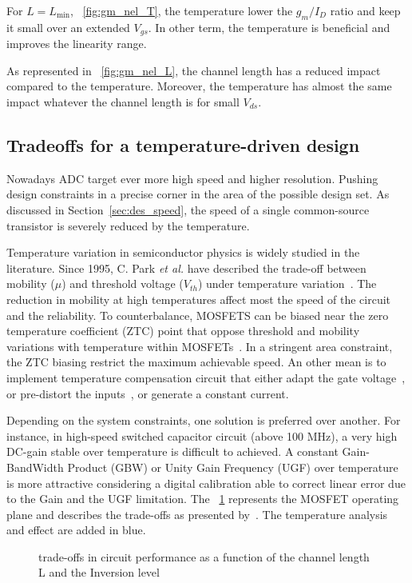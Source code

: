 For \(L = L_{\min}\), \figurename~\ref{fig:gm_nel_T}, the temperature lower the \(g_m/I_D\) ratio and keep it small over an extended \(V_{gs}\). In other term, the temperature is beneficial and improves the linearity range.

As represented in \figurename~\ref{fig:gm_nel_L}, the channel length has a reduced impact compared to the temperature. Moreover, the temperature has almost the same impact whatever the channel length is for small \(V_{ds}\).

\subsection{Tradeoffs for a temperature-driven design}
Nowadays ADC target ever more high speed and higher resolution. Pushing design constraints in a precise corner in the area of the possible design set. As discussed in Section~\ref{sec:des_speed}, the speed of a single common-source transistor is severely reduced by the temperature. 

Temperature variation in semiconductor physics is widely studied in the literature. Since 1995, C. Park \textit{et al.} have described the trade-off between mobility (\(\mu \)) and threshold voltage (\(V_{th} \)) under temperature variation~\cite{Park1995}. The reduction in mobility at high temperatures affect most the speed of the circuit and the reliability. To counterbalance, MOSFETS can be biased near the zero temperature coefficient (ZTC) point that oppose threshold and mobility variations with temperature within MOSFETs~\cite{Shoucair1986,Filanovsky2001}. In a stringent area constraint, the ZTC biasing restrict the maximum achievable speed. An other mean is to implement temperature compensation circuit that either adapt the gate voltage~\cite{Chen2011, Gomez2010}, or pre-distort the inputs~\cite{Sira2013}, or generate a constant current.

Depending on the system constraints, one solution is preferred over another. For instance, in high-speed switched capacitor circuit (above 100 MHz), a very high DC-gain stable over temperature is difficult to achieved. A constant Gain-BandWidth Product (GBW) or Unity Gain Frequency (UGF) over temperature is more attractive considering a digital calibration able to correct linear error due to the Gain and the UGF limitation. The \figurename~\ref{fig:tradeoffs} represents the MOSFET operating plane and describes the trade-offs as presented by~\cite{Binkley2003}. The temperature analysis and effect are added in blue.

\begin{figure}[!ht]
    \centering
    
    \caption{trade-offs in circuit performance as a function of the channel length L and the Inversion level}
    \label{fig:tradeoffs}
\end{figure}

